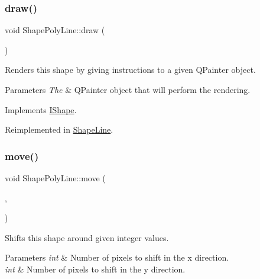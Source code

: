 \subsubsection{\texorpdfstring{draw()}{draw()}}
{\footnotesize\ttfamily void Shape\+Poly\+Line\+::draw (\begin{DoxyParamCaption}\item[{Q\+Painter \&}]{ }\end{DoxyParamCaption})\hspace{0.3cm}{\ttfamily [virtual]}}



Renders this shape by giving instructions to a given Q\+Painter object. 


\begin{DoxyParams}{Parameters}
{\em The} & Q\+Painter object that will perform the rendering. \\
\hline
\end{DoxyParams}


Implements \mbox{\hyperlink{class_i_shape_ad97c626e7e2c9afb9f51efc41b836e6f}{I\+Shape}}.



Reimplemented in \mbox{\hyperlink{class_shape_line_a8b4dbfe05387934a0f9c4a053a798239}{Shape\+Line}}.

\mbox{\label{class_shape_poly_line_a7c1971596b171c4c08ec5657b6592354}} 
\subsubsection{\texorpdfstring{move()}{move()}}
{\footnotesize\ttfamily void Shape\+Poly\+Line\+::move (\begin{DoxyParamCaption}\item[{int}]{,  }\item[{int}]{ }\end{DoxyParamCaption})\hspace{0.3cm}{\ttfamily [virtual]}}



Shifts this shape around given integer values. 


\begin{DoxyParams}{Parameters}
{\em int} & Number of pixels to shift in the x direction. \\
\hline
{\em int} & Number of pixels to shift in the y direction. \\
\hline
\end{DoxyParams}


